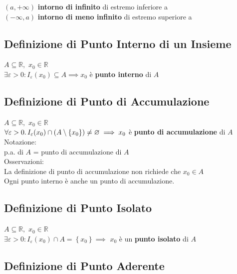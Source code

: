 \documentclass[a4paper, twoside, italian, 11pt]{book}
\newcommand{\braces}[1] {\left \{ #1 \right \}}
\newcommand{\R}{\mathbb{R}}
\let\emptyset\varnothing
\begin{document}
$(a, +\infty)$ \textbf{intorno di infinito} di estremo inferiore a \\
\indent
$(-\infty, a)$ \textbf{intorno di meno infinito} di estremo superiore a


\subsection{Definizione di Punto Interno di un Insieme}

\noindent
$A \subseteq \R,$ $x_0 \in \R$ \\

$\exists \varepsilon > 0 : I_\varepsilon(x_0) \subseteq A \implies x_0$ è \textbf{punto interno} di $A$


\subsection{Definizione di Punto di Accumulazione}

\noindent
$A \subseteq \R,$ $x_0 \in \R$ \\

$\forall \varepsilon > 0 \ldotp I_\varepsilon(x_0) \cap (A \setminus \braces{x_0}) \neq \emptyset \implies x_0$ è \textbf{punto di accumulazione} di $A$ \\

\noindent
Notazione: \\
p.a. di $A$ = punto di accumulazione di $A$ \\

\noindent
Osservazioni: \\
La definizione di punto di accumulazione non richiede che $x_0 \in A$ \\
Ogni punto interno è anche un punto di accumulazione.


\subsection{Definizione di Punto Isolato}

\noindent
$A \subseteq \R,$ $x_0 \in \R$ \\

$\exists \varepsilon > 0 : I_\varepsilon(x_0) \cap A = \braces{x_0} \implies$ $x_0$ è un \textbf{punto isolato} di $A$


\subsection{Definizione di Punto Aderente}
\end{document}
